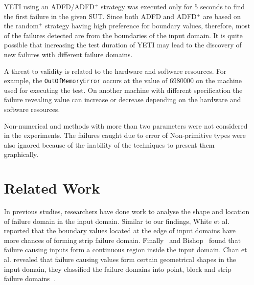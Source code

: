 YETI using an ADFD/ADFD$^+$ strategy was executed only for 5 seconds to find the first failure in the given SUT. Since both ADFD and ADFD$^+$ are based on the random$^+$ strategy having high preference for boundary values, therefore, most of the failures detected are from the boundaries of the input domain. It is quite possible that increasing the test duration of YETI may lead to the discovery of new failures with different failure domains.

A threat to validity is related to the hardware and software resources. For example, the \verb+OutOfMemoryError+ occurs at the value of 6980000 on the machine used for executing the test. On another machine with different specification the failure revealing value can increase or decrease depending on the hardware and software resources.

Non-numerical and methods with more than two parameters were not considered in the experiments. The failures caught due to error of Non-primitive types were also ignored because of the inability of the techniques to present them graphically. 












\section{Related Work}
In previous studies, researchers have done work to analyse the shape and location of failure domain in the input domain. Similar to our findings, White et al.~\cite{white1980domain} reported that the boundary values located at the edge of input domains have more chances of forming strip failure domain. Finally~\cite{finelli1991nasa} and Bishop~\cite{bishop1993variation} found that failure causing inputs form a continuous region inside the input domain. Chan et al. revealed that failure causing values form certain geometrical shapes in the input domain, they classified the failure domains into point, block and strip failure domains~\cite{chan1996proportional}. 

